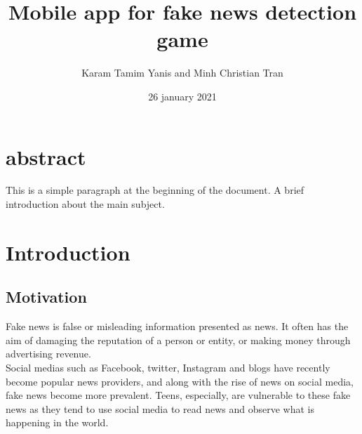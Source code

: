 \documentclass[12pt, letterpaper, twoside]{article}
\title{Mobile app for fake news detection game}
\author{Karam Tamim Yanis and Minh Christian Tran}
\date{26 january 2021}
\begin{document}
\begin{titlepage}
\maketitle
\thispagestyle{empty}%
\end{titlepage}

\section*{abstract}
This is a simple paragraph at the beginning of the 
document. A brief introduction about the main subject.
\cleardoublepage


\tableofcontents
\thispagestyle{empty}%
\cleardoublepage%

\setcounter{page}{1}%

\section{Introduction}
\subsection{Motivation}
Fake news is false or misleading information presented as news. It often has the aim of damaging the reputation of a person or entity, or making money through advertising revenue.\\

Social medias such as Facebook, twitter, Instagram and blogs have recently become popular news providers, and along with the rise of news on social media, fake news become more prevalent. Teens, especially, are vulnerable to these fake news as they tend to use social media to read news and observe what is happening in the world.\\ 
\end{document}
